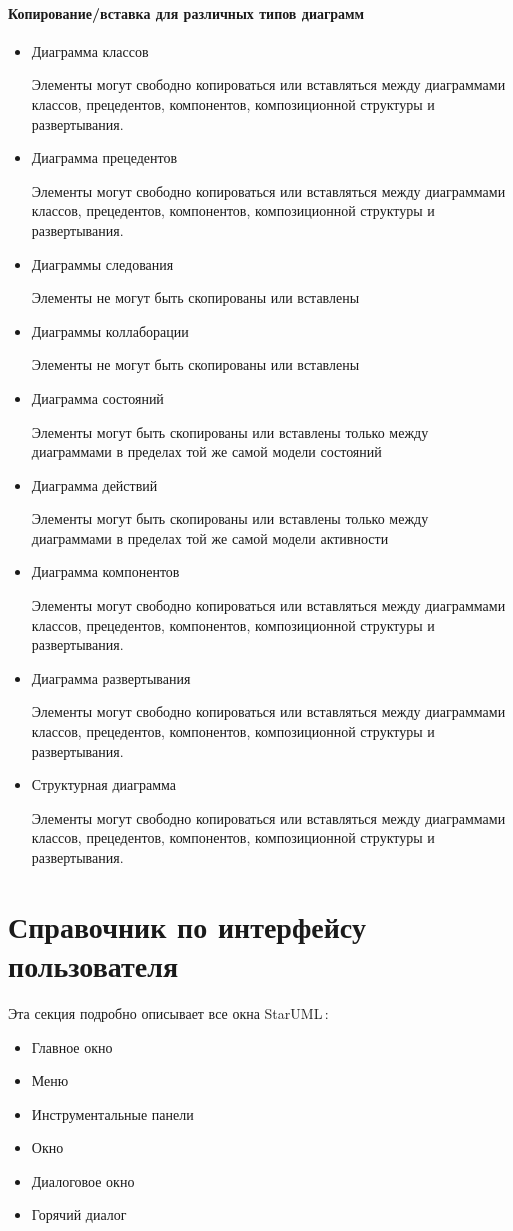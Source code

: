 \documentclass[a4paper,12pt]{extreport}
\newcommand{\staruml}{StarUML\,\tm}
\begin{document}
\subsubsection*{Копирование/вставка для различных типов диаграмм}
\begin{itemize}
	\item Диаграмма классов
	
	Элементы могут свободно копироваться или вставляться между диаграммами классов,
	прецедентов, компонентов, композиционной структуры и развертывания.
	\item Диаграмма прецедентов
	
	Элементы могут свободно копироваться или вставляться между диаграммами классов,
	прецедентов, компонентов, композиционной структуры и развертывания.
	\item Диаграммы следования
	
	Элементы не могут быть скопированы или вставлены
	\item Диаграммы коллаборации
	
	Элементы не могут быть скопированы или вставлены
	\item Диаграмма состояний
	
	Элементы могут быть скопированы или вставлены только между диаграммами в пределах
	той же самой модели состояний
	\item Диаграмма действий
	
	Элементы могут быть скопированы или вставлены только между диаграммами в пределах
	той же самой модели активности
	\item Диаграмма компонентов
	
	Элементы могут свободно копироваться или вставляться между диаграммами классов,
	прецедентов, компонентов, композиционной структуры и развертывания.
	\item Диаграмма развертывания
	
	Элементы могут свободно копироваться или вставляться между диаграммами классов,
	прецедентов, компонентов, композиционной структуры и развертывания.
	\item Структурная диаграмма
	
	Элементы могут свободно копироваться или вставляться между диаграммами классов,
	прецедентов, компонентов, композиционной структуры и развертывания.
\end{itemize}


\chapter{Справочник по интерфейсу пользователя}
Эта секция подробно описывает все окна \staruml:
\begin{itemize}
	\item Главное окно
	\item Меню
	\item Инструментальные панели
	\item Окно
	\item Диалоговое окно
	\item Горячий диалог
\end{itemize}
\end{document}
